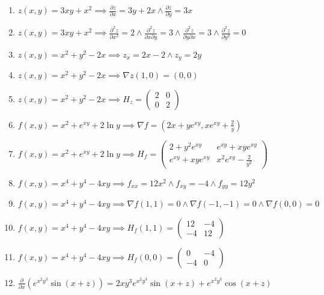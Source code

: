 \documentclass[11pt,a4paper]{article}
\begin{document}
\begin{enumerate}
\item $\displaystyle z(x, y) = 3xy + x^{2} \implies \frac{\partial z}{\partial x} = 3y + 2x \land \frac{\partial z}{\partial y} = 3x$
\item $\displaystyle z(x, y) = 3xy + x^{2} \implies \frac{\partial^{2} z}{\partial x^{2}} = 2 \land \frac{\partial^{2} z}{\partial x \partial y} = 3 \land \frac{\partial^{2} z}{\partial y \partial x} = 3 \land \frac{\partial^{2} z}{\partial y^{2}} = 0$
\item $\displaystyle z(x, y) = x^{2} + y^{2} - 2x \implies z_{x} = 2x - 2 \land z_{y} = 2y$
\item $\displaystyle z(x, y) = x^{2} + y^{2} - 2x \implies \nabla z(1, 0) = (0, 0)$
\item $\displaystyle z(x, y) = x^{2} + y^{2} - 2x \implies H_{z} = \begin{pmatrix} 2 & 0 \\ 0 & 2 \end{pmatrix}$
\item $\displaystyle f(x, y) = x^{2} + e^{xy} + 2\ln y \implies \nabla f = \left( 2x + y e^{xy}, x e^{xy} + \frac{2}{y} \right)$
\item $\displaystyle f(x, y) = x^{2} + e^{xy} + 2\ln y \implies H_{f} = \begin{pmatrix} 2 + y^{2} e^{xy} & e^{xy} + xy e^{xy} \\ e^{xy} + xy e^{xy} & x^{2} e^{xy} - \frac{2}{y^{2}} \end{pmatrix}$
\item $\displaystyle f(x, y) = x^{4} + y^{4} - 4xy \implies f_{xx} = 12x^{2} \land f_{xy} = -4 \land f_{yy} = 12y^{2}$
\item $\displaystyle f(x, y) = x^{4} + y^{4} - 4xy \implies \nabla f(1, 1) = 0 \land \nabla f(-1, -1) = 0 \land \nabla f(0, 0) = 0$
\item $\displaystyle f(x, y) = x^{4} + y^{4} - 4xy \implies H_{f}(1, 1) = \begin{pmatrix} 12 & -4 \\ -4 & 12 \end{pmatrix}$
\item $\displaystyle f(x, y) = x^{4} + y^{4} - 4xy \implies H_{f}(0, 0) = \begin{pmatrix} 0 & -4 \\ -4 & 0 \end{pmatrix}$
\item $\displaystyle \frac{\partial}{\partial x}\left( e^{x^{2} y^{3}} \sin(x + z) \right) = 2xy^{3} e^{x^{2} y^{3}} \sin(x + z) + e^{x^{2} y^{3}} \cos(x + z)$

\end{enumerate}
\end{document}
